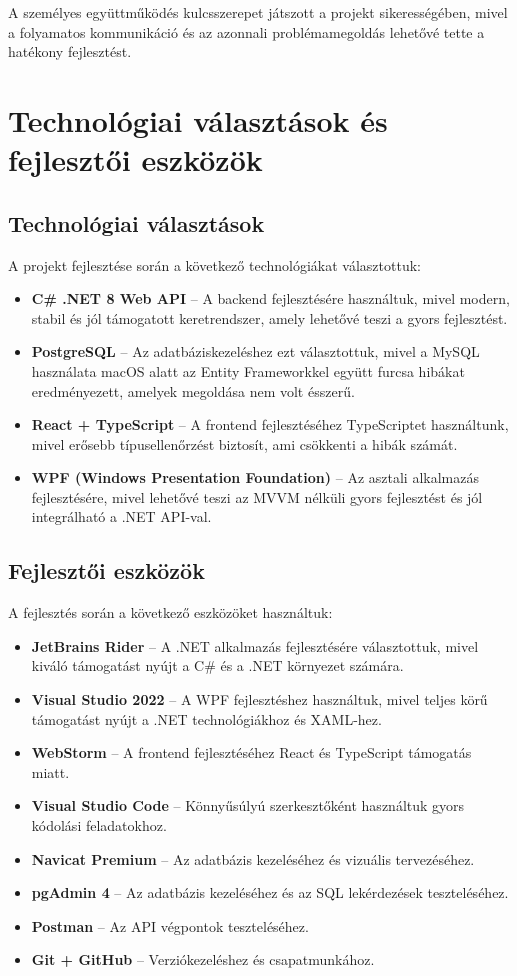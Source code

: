 \documentclass{report}[11pt]
\begin{document}
A személyes együttműködés kulcsszerepet játszott a projekt sikerességében, mivel a folyamatos kommunikáció és az azonnali problémamegoldás lehetővé tette a hatékony fejlesztést.


\chapter{Technológiai választások és fejlesztői eszközök}

\section{Technológiai választások}
A projekt fejlesztése során a következő technológiákat választottuk:

\begin{itemize}
    \item \textbf{C\# .NET 8 Web API} – A backend fejlesztésére használtuk, mivel modern, stabil és jól támogatott keretrendszer, amely lehetővé teszi a gyors fejlesztést.
    \item \textbf{PostgreSQL} – Az adatbáziskezeléshez ezt választottuk, mivel a MySQL használata macOS alatt az Entity Frameworkkel együtt furcsa hibákat eredményezett, amelyek megoldása nem volt ésszerű.
    \item \textbf{React + TypeScript} – A frontend fejlesztéséhez TypeScriptet használtunk, mivel erősebb típusellenőrzést biztosít, ami csökkenti a hibák számát.
    \item \textbf{WPF (Windows Presentation Foundation)} – Az asztali alkalmazás fejlesztésére, mivel lehetővé teszi az MVVM nélküli gyors fejlesztést és jól integrálható a .NET API-val.
\end{itemize}

\section{Fejlesztői eszközök}
A fejlesztés során a következő eszközöket használtuk:

\begin{itemize}
    \item \textbf{JetBrains Rider} – A .NET alkalmazás fejlesztésére választottuk, mivel kiváló támogatást nyújt a C\# és a .NET környezet számára.
    \item \textbf{Visual Studio 2022} – A WPF fejlesztéshez használtuk, mivel teljes körű támogatást nyújt a .NET technológiákhoz és XAML-hez.
    \item \textbf{WebStorm} – A frontend fejlesztéséhez React és TypeScript támogatás miatt.
    \item \textbf{Visual Studio Code} – Könnyűsúlyú szerkesztőként használtuk gyors kódolási feladatokhoz.
    \item \textbf{Navicat Premium} – Az adatbázis kezeléséhez és vizuális tervezéséhez.
    \item \textbf{pgAdmin 4} – Az adatbázis kezeléséhez és az SQL lekérdezések teszteléséhez.
    \item \textbf{Postman} – Az API végpontok teszteléséhez.
    \item \textbf{Git + GitHub} – Verziókezeléshez és csapatmunkához.
\end{itemize}
\end{document}
